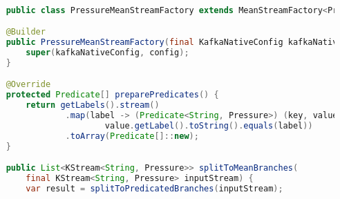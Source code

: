 \begin{lstlisting}[caption={Implementacja w klasie PressureMeanStreamFactory}, label={lst:pressure_mean_stream_factory},language=Java]

    public class PressureMeanStreamFactory extends MeanStreamFactory<Pressure, PressureAggregation> {

    @Builder
    public PressureMeanStreamFactory(final KafkaNativeConfig kafkaNativeConfig, final MeanStreamConfig config) {
        super(kafkaNativeConfig, config);
    }

    @Override
    protected Predicate[] preparePredicates() {
        return getLabels().stream()
                .map(label -> (Predicate<String, Pressure>) (key, value) -> 
                        value.getLabel().toString().equals(label))
                .toArray(Predicate[]::new);
    }

    public List<KStream<String, Pressure>> splitToMeanBranches(
        final KStream<String, Pressure> inputStream) {
        var result = splitToPredicatedBranches(inputStream);


\end{lstlisting}
